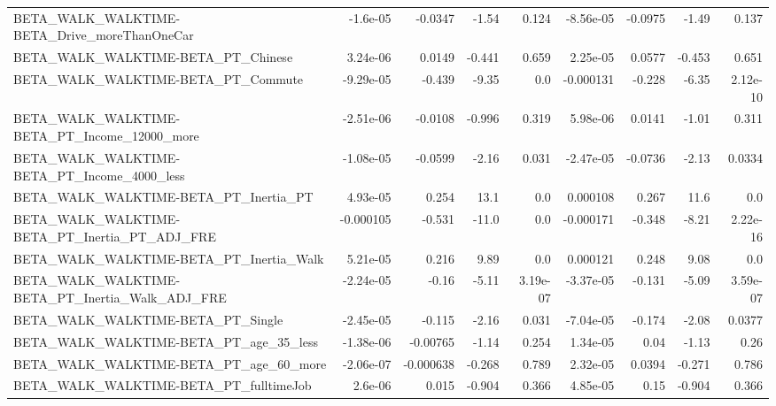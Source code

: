 \begin{tabular}{lrrrrrrrr}
BETA\_WALK\_WALKTIME-BETA\_Drive\_moreThanOneCar       &    -1.6e-05 &      -0.0347 &    -1.54 &    0.124 &  -8.56e-05 &     -0.0975 &        -1.49 &         0.137 \\
BETA\_WALK\_WALKTIME-BETA\_PT\_Chinese                 &    3.24e-06 &       0.0149 &   -0.441 &    0.659 &   2.25e-05 &      0.0577 &       -0.453 &         0.651 \\
BETA\_WALK\_WALKTIME-BETA\_PT\_Commute                 &   -9.29e-05 &       -0.439 &    -9.35 &      0.0 &  -0.000131 &      -0.228 &        -6.35 &      2.12e-10 \\
BETA\_WALK\_WALKTIME-BETA\_PT\_Income\_12000\_more       &   -2.51e-06 &      -0.0108 &   -0.996 &    0.319 &   5.98e-06 &      0.0141 &        -1.01 &         0.311 \\
BETA\_WALK\_WALKTIME-BETA\_PT\_Income\_4000\_less        &   -1.08e-05 &      -0.0599 &    -2.16 &    0.031 &  -2.47e-05 &     -0.0736 &        -2.13 &        0.0334 \\
BETA\_WALK\_WALKTIME-BETA\_PT\_Inertia\_PT              &    4.93e-05 &        0.254 &     13.1 &      0.0 &   0.000108 &       0.267 &         11.6 &           0.0 \\
BETA\_WALK\_WALKTIME-BETA\_PT\_Inertia\_PT\_ADJ\_FRE      &   -0.000105 &       -0.531 &    -11.0 &      0.0 &  -0.000171 &      -0.348 &        -8.21 &      2.22e-16 \\
BETA\_WALK\_WALKTIME-BETA\_PT\_Inertia\_Walk            &    5.21e-05 &        0.216 &     9.89 &      0.0 &   0.000121 &       0.248 &         9.08 &           0.0 \\
BETA\_WALK\_WALKTIME-BETA\_PT\_Inertia\_Walk\_ADJ\_FRE    &   -2.24e-05 &        -0.16 &    -5.11 & 3.19e-07 &  -3.37e-05 &      -0.131 &        -5.09 &      3.59e-07 \\
BETA\_WALK\_WALKTIME-BETA\_PT\_Single                  &   -2.45e-05 &       -0.115 &    -2.16 &    0.031 &  -7.04e-05 &      -0.174 &        -2.08 &        0.0377 \\
BETA\_WALK\_WALKTIME-BETA\_PT\_age\_35\_less             &   -1.38e-06 &     -0.00765 &    -1.14 &    0.254 &   1.34e-05 &        0.04 &        -1.13 &          0.26 \\
BETA\_WALK\_WALKTIME-BETA\_PT\_age\_60\_more             &   -2.06e-07 &    -0.000638 &   -0.268 &    0.789 &   2.32e-05 &      0.0394 &       -0.271 &         0.786 \\
BETA\_WALK\_WALKTIME-BETA\_PT\_fulltimeJob             &     2.6e-06 &        0.015 &   -0.904 &    0.366 &   4.85e-05 &        0.15 &       -0.904 &         0.366 \\

\end{tabular}
